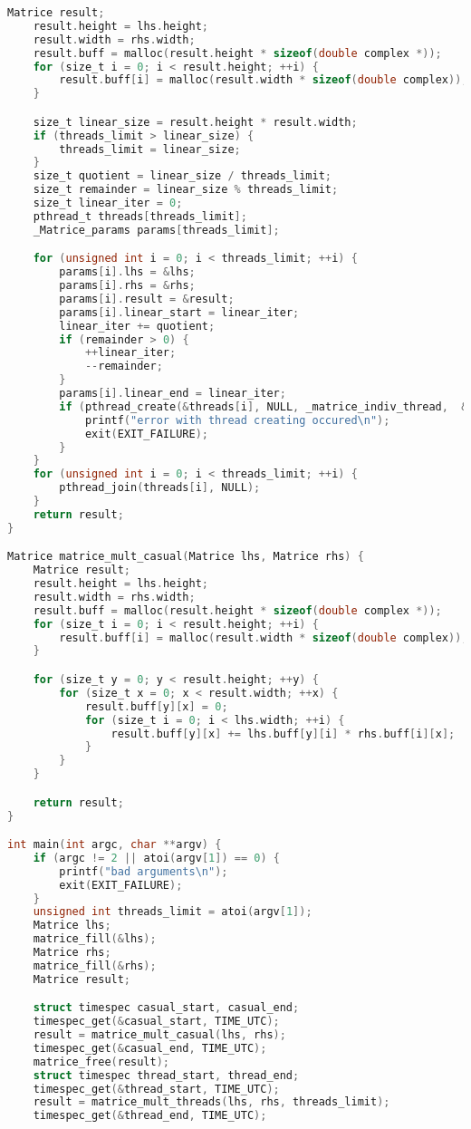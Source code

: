 \begin{lstlisting}[language=C]
    Matrice result;
    result.height = lhs.height;
    result.width = rhs.width;
    result.buff = malloc(result.height * sizeof(double complex *));
    for (size_t i = 0; i < result.height; ++i) {
        result.buff[i] = malloc(result.width * sizeof(double complex));
    }

    size_t linear_size = result.height * result.width;
    if (threads_limit > linear_size) {
        threads_limit = linear_size;
    }
    size_t quotient = linear_size / threads_limit;
    size_t remainder = linear_size % threads_limit;
    size_t linear_iter = 0;
    pthread_t threads[threads_limit];
    _Matrice_params params[threads_limit];

    for (unsigned int i = 0; i < threads_limit; ++i) {
        params[i].lhs = &lhs;
        params[i].rhs = &rhs;
        params[i].result = &result;
        params[i].linear_start = linear_iter;
        linear_iter += quotient;
        if (remainder > 0) {
            ++linear_iter;
            --remainder;
        }
        params[i].linear_end = linear_iter;
        if (pthread_create(&threads[i], NULL, _matrice_indiv_thread,  &params[i]) != 0) {
            printf("error with thread creating occured\n");
            exit(EXIT_FAILURE);
        }
    }
    for (unsigned int i = 0; i < threads_limit; ++i) {
        pthread_join(threads[i], NULL);
    }
    return result;
}

Matrice matrice_mult_casual(Matrice lhs, Matrice rhs) {
    Matrice result;
    result.height = lhs.height;
    result.width = rhs.width;
    result.buff = malloc(result.height * sizeof(double complex *));
    for (size_t i = 0; i < result.height; ++i) {
        result.buff[i] = malloc(result.width * sizeof(double complex));
    }

    for (size_t y = 0; y < result.height; ++y) {
        for (size_t x = 0; x < result.width; ++x) {
            result.buff[y][x] = 0;
            for (size_t i = 0; i < lhs.width; ++i) {
                result.buff[y][x] += lhs.buff[y][i] * rhs.buff[i][x];
            }
        }
    }

    return result;
}

int main(int argc, char **argv) {
    if (argc != 2 || atoi(argv[1]) == 0) {
        printf("bad arguments\n");
        exit(EXIT_FAILURE);
    }
    unsigned int threads_limit = atoi(argv[1]);
    Matrice lhs;
    matrice_fill(&lhs);
    Matrice rhs;
    matrice_fill(&rhs);
    Matrice result;

    struct timespec casual_start, casual_end;
    timespec_get(&casual_start, TIME_UTC);
    result = matrice_mult_casual(lhs, rhs);
    timespec_get(&casual_end, TIME_UTC);
    matrice_free(result);
    struct timespec thread_start, thread_end;
    timespec_get(&thread_start, TIME_UTC);
    result = matrice_mult_threads(lhs, rhs, threads_limit);
    timespec_get(&thread_end, TIME_UTC);


\end{lstlisting}
